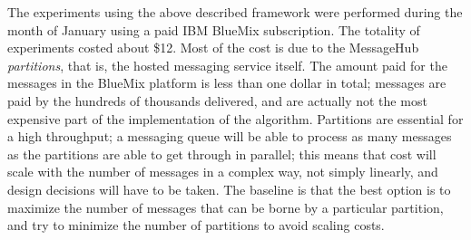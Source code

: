 \documentclass{llncs}
\begin{document}
  The experiments using the above described framework were performed
  during the month of January using a paid IBM BlueMix subscription. The
  totality of experiments costed about \$12. Most of the cost is due to
  the MessageHub {\em partitions}, that is, the hosted messaging service
  itself. The amount paid for the messages in the BlueMix platform
  is less than one dollar in total; messages are paid by the hundreds of
  thousands delivered, and are actually not the most expensive part of the
  implementation of the algorithm.
  Partitions are
  essential for a high throughput; a messaging queue will be able to
  process as many messages as the partitions are able to get through in
  parallel; this means that cost will scale with the number of messages
  in a complex way, not simply linearly, and design decisions will have
  to be taken. The baseline is that the best option is to maximize the
  number of messages that can be borne by a particular partition, and
  try to minimize the number of partitions to avoid scaling costs.
\end{document}
